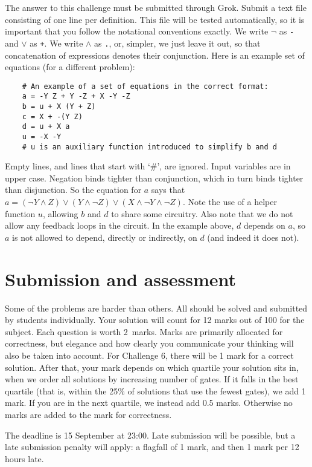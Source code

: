 \documentclass[12pt]{article}
\begin{document}
The answer to this challenge must be submitted through Grok.
Submit a text file consisting of one line per definition.
This file will be tested automatically, so it is important that
you follow the notational conventions exactly.
We write $\neg$ as \texttt{-} and $\lor$ as \texttt{+}.
We write $\land$ as \texttt{.}, or, simpler, we just leave it out,
so that concatenation of expressions denotes their conjunction.
Here is an example set of equations (for a different problem):
\begin{verbatim}
    # An example of a set of equations in the correct format:
    a = -Y Z + Y -Z + X -Y -Z
    b = u + X (Y + Z)
    c = X + -(Y Z)
    d = u + X a
    u = -X -Y
    # u is an auxiliary function introduced to simplify b and d
\end{verbatim}
Empty lines, and lines that start with `\#', are ignored.
Input variables are in upper case.
Negation binds tighter than conjunction, which in
turn binds tighter than disjunction.
So the equation for $a$ says that
$a = (\neg Y \land Z) \lor (Y \land \neg Z) 
	\lor (X \land \neg Y \land \neg Z)$.
Note the use of a helper function $u$, allowing $b$ and $d$ to
share some circuitry.
Also note that we do not allow any feedback loops in the circuit.
In the example above, $d$ depends on $a$, so $a$ is not allowed
to depend, directly or indirectly, on $d$ (and indeed it does not).

\section*{Submission and assessment}
Some of the problems are harder than others.
All should be solved and submitted by students individually.
Your solution will count for 12 marks out of 100 for the subject.
Each question is worth 2~marks.
Marks are primarily allocated for correctness, but elegance and how
clearly you communicate your thinking will also be taken into account.
For Challenge 6, there will be 1 mark for a correct solution. 
After that, your mark depends on which quartile your solution sits in, 
when we order all solutions by increasing number of gates.
If it falls in the best quartile (that is, within the 25\% of
solutions that use the fewest gates), we add 1 mark.
If you are in the next quartile, we instead add 0.5 marks.
Otherwise no marks are added to the mark for correctness.

The deadline is 15 September at 23:00.
Late submission will be possible, but a late submission penalty will
apply: a flagfall of 1 mark, and then 1 mark per 12 hours late.
\end{document}
